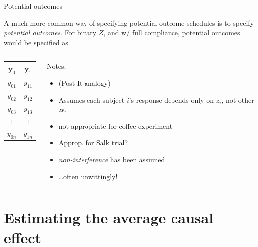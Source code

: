 \begin{frame}{Potential outcomes}
  
A much more common way of specifying potential outcome schedules is to
specify \textit{potential outcomes}.  For binary $Z$, and w/ full
compliance, potential outcomes would be specified as

\begin{columns}
\begin{Column}
    \begin{tabular}{cc} \hline
 $\mathbf{y}_0$ & $\mathbf{y}_1$ \\ \hline
$y_{01}$ & $y_{11}$  \\
$y_{02}$ & $y_{12}$  \\
$y_{03}$ & $y_{13}$  \\
$\vdots$ & $\vdots$  \\
$y_{0n}$ & $y_{1n}$  \\ \hline
    \end{tabular}
\pause
\end{Column}

\begin{Column}
Notes:\\

\begin{itemize}
\item<1-> (Post-It analogy)
\item<2-> Assumes each subject $i$'s response depends only on $z_{i}$, not
  other $z$s.
\item<2-> not appropriate for coffee experiment
\item<2-> Approp. for Salk trial?
\item<2-> \textit{non-interference} has been assumed
\item<3-> \ldots often unwittingly! 
\end{itemize}
  
\end{Column}
\end{columns}

\end{frame}


\section[Estimating the ACE]{Estimating the average causal effect}


